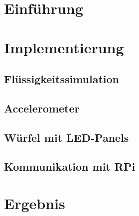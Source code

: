 \documentclass[12pt, a4paper]{book}
\begin{document}
\pagestyle{fancy}






\clearpage
\chapter{Einführung}
\label{chap:einfuehrung}


\chapter{Implementierung}

\section{Flüssigkeitssimulation}

\section{Accelerometer}

\section{Würfel mit LED-Panels}

\section{Kommunikation mit RPi} %


\chapter{Ergebnis}


\clearpage




\clearpage\newpage
{}

\end{document}
